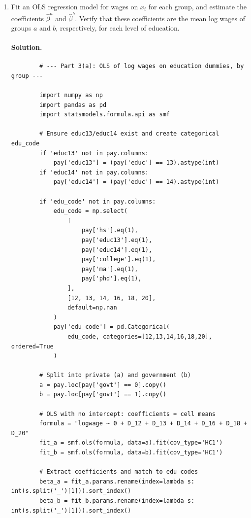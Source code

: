 \documentclass[12pt]{article}
\numberwithin{equation}{section}
\newcommand{\solution}{\paragraph{Solution.}}
\begin{document}
\begin{enumerate}[leftmargin=2em]
  \begin{enumerate}[label=(\alph*),leftmargin=1.6em]
    \item Fit an OLS regression model for wages on $x_i$ for each group, and estimate the coefficients $\hat{\beta}^a$ and $\hat{\beta}^b$. Verify that these coefficients are the mean log wages of groups $a$ and $b$, respectively, for each level of education.

    \solution
    \begin{listing}[H]
        \begin{verbatim}
        # --- Part 3(a): OLS of log wages on education dummies, by group ---
    
        import numpy as np
        import pandas as pd
        import statsmodels.formula.api as smf
    
        # Ensure educ13/educ14 exist and create categorical edu_code
        if 'educ13' not in pay.columns:
            pay['educ13'] = (pay['educ'] == 13).astype(int)
        if 'educ14' not in pay.columns:
            pay['educ14'] = (pay['educ'] == 14).astype(int)
    
        if 'edu_code' not in pay.columns:
            edu_code = np.select(
                [
                    pay['hs'].eq(1),
                    pay['educ13'].eq(1),
                    pay['educ14'].eq(1),
                    pay['college'].eq(1),
                    pay['ma'].eq(1),
                    pay['phd'].eq(1),
                ],
                [12, 13, 14, 16, 18, 20],
                default=np.nan
            )
            pay['edu_code'] = pd.Categorical(
                edu_code, categories=[12,13,14,16,18,20], ordered=True
            )
    
        # Split into private (a) and government (b)
        a = pay.loc[pay['govt'] == 0].copy()
        b = pay.loc[pay['govt'] == 1].copy()
    
        # OLS with no intercept: coefficients = cell means
        formula = "logwage ~ 0 + D_12 + D_13 + D_14 + D_16 + D_18 + D_20"
        fit_a = smf.ols(formula, data=a).fit(cov_type='HC1')
        fit_b = smf.ols(formula, data=b).fit(cov_type='HC1')
    
        # Extract coefficients and match to edu codes
        beta_a = fit_a.params.rename(index=lambda s: int(s.split('_')[1])).sort_index()
        beta_b = fit_b.params.rename(index=lambda s: int(s.split('_')[1])).sort_index()
    

\end{verbatim}
\end{listing}
\end{enumerate}
\end{enumerate}
\end{document}
